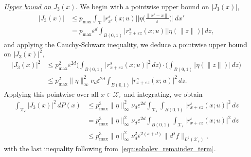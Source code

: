 \documentclass{article}
\newcommand{\1}{\mathbf{1}}
\newcommand{\mc}[1]{\mathcal{#1}}
\theoremstyle{definition}
\theoremstyle{remark}
\begin{document}
\underline{\textit{Upper bound on $J_3(x)$}}.
We begin with a pointwise upper bound on $|J_3(x)|$, 
\begin{align*}
|J_3(x)| & \leq p_{\max} \int_{\mc{X}} \bigl|r_{x'}^s(x;u)\bigr| \biggl|\eta\biggl(\frac{\|x' - x\|}{\varepsilon}\biggr)\biggr| \,dx' \\
& = p_{\max} \varepsilon^d \int_{B(0,1)} \bigl|r_{x + \varepsilon z}^s(x;u)\bigr| \bigl|\eta(\|z\|)\bigr| \,dz,
\end{align*}
and applying the Cauchy-Schwarz inequality, we deduce a pointwise upper bound on $|J_3(x)|^2$,
\begin{align*}
|J_3(x)|^2 & \leq p_{\max}^2 \varepsilon^{2d} \biggl(\int_{B(0,1)} \bigl|r_{x + \varepsilon z}^s(x;u)\bigr|^2 \,dz\biggr) \cdot \biggl(\int_{B(0,1)} \bigl|\eta(\|z\|)\bigr| \,dz\biggr) \\
& \leq p_{\max}^2 \|\eta\|_{\infty}^2 \nu_d \varepsilon^{2d}  \int_{B(0,1)} \bigl|r_{x + \varepsilon z}^s(x;u)\bigr|^2 \,dz.
\end{align*}
Applying this pointwise over all $x \in \mc{X}_{\varepsilon}$ and integrating, we obtain
\begin{align*}
\int_{\mc{X}_{\varepsilon}} |J_3(x)|^2 \,dP(x) & \leq p_{\max}^3 \|\eta\|_{\infty}^2 \nu_d \varepsilon^{2d} \int_{\mc{X}_{\varepsilon}} \int_{B(0,1)} \bigl|r_{x + \varepsilon z}^s(x;u)\bigr|^2 \,dz \\
& = p_{\max}^3 \|\eta\|_{\infty}^2 \nu_d \varepsilon^{2d} \int_{B(0,1)} \int_{\mc{X}_{\varepsilon}} \bigl|r_{x + \varepsilon z}^s(x;u)\bigr|^2 \,dz \\
& \leq p_{\max}^3 \|\eta\|_{\infty}^2 \nu_d^2 \varepsilon^{2(s + d)} \|d^sf\|_{L^2(\mc{X}_{\varepsilon})},
\end{align*}
with the last inequality following from~\eqref{eqn:sobolev_remainder_term}.
\end{document}
